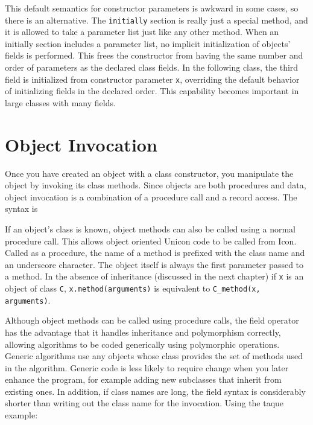 This default semantics for constructor parameters is awkward in some
cases, so there is an alternative. The \texttt{initially} section is
really just a special method, and it is allowed to take a parameter
list just like any other method. When an initially section includes a
parameter list, no implicit initialization of objects'
fields is performed. This frees the constructor from having the same
number and order of parameters as the declared class fields. In the
following class, the third field is initialized from constructor
parameter \texttt{x}, overriding the default behavior of initializing
fields in the declared order. This capability becomes important in
large classes with many fields.


\section{Object Invocation}

Once you have created an object with a class constructor, you manipulate
the object by invoking its class methods. Since objects are
both procedures and data, object invocation is a combination of a procedure call and a record
access. The syntax is


If an object's class is known, object methods can also
be called using a normal procedure call. This allows object oriented
Unicon code to be called from Icon. Called as a procedure, the name of
a method is prefixed with the class name and an underscore character.
The object itself is always the first parameter passed to a method. In
the absence of inheritance (discussed in the next chapter) if
\texttt{x} is an object of class \texttt{C},
\texttt{x.method(arguments)} is equivalent to \texttt{C\_method(x,
arguments)}.

Although object methods can be called using procedure calls, the field
operator has the advantage that it handles inheritance and polymorphism
correctly, allowing algorithms to be coded generically using
polymorphic operations. Generic algorithms use any objects whose class
provides the set of methods used in the algorithm. Generic code is less
likely to require change when you later enhance the program, for
example adding new subclasses that inherit from
existing ones. In addition, if class names are long, the field syntax
is considerably shorter than writing out the class name for the
invocation. Using the taque example: 

